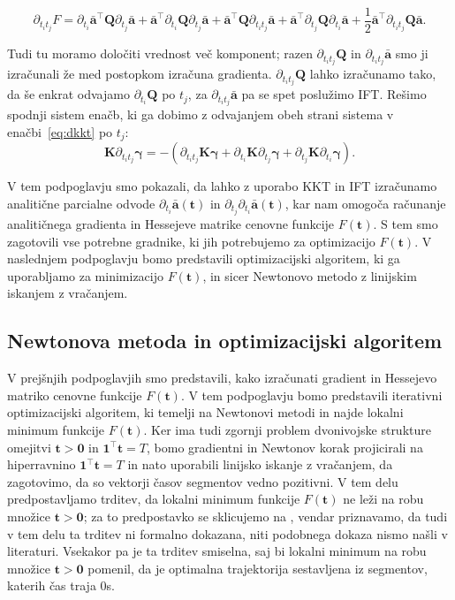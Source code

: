 \documentclass[isrm2, tisk]{fmfdelo}
\newcommand{\aimplicit}{\bar{\mathbf{a}}}
\newcommand{\yimplicit}{\mathbf{\gamma}}
\newcommand{\qmat}{\mathbf{Q}}
\newcommand{\tvec}{\mathbf{t}}
\begin{document}
\begin{equation}
    \label{eq:hess}
    \partial_{t_it_j}F = 
    \partial_{t_i}\aimplicit^\top \qmat \partial_{t_j}\aimplicit 
    + \aimplicit^\top \partial_{t_i}\qmat \partial_{t_j}\aimplicit 
    + \aimplicit^\top \qmat \partial_{t_it_j}\aimplicit 
    + \aimplicit^\top \partial_{t_j}\qmat \partial_{t_i}\aimplicit 
    + \frac{1}{2}\aimplicit^\top \partial_{t_it_j}\qmat \aimplicit.
\end{equation}

Tudi tu moramo določiti vrednost več komponent; razen $\partial_{t_it_j} \qmat$ in $\partial_{t_it_j} \aimplicit$ smo ji izračunali že med postopkom izračuna gradienta. $\partial_{t_it_j} \qmat$ lahko izračunamo tako, da še enkrat odvajamo $\partial_{t_i} \qmat$ po $t_j$, za $\partial_{t_it_j} \aimplicit$ pa se spet poslužimo \ac{IFT}. Rešimo spodnji sistem enačb, ki ga dobimo z odvajanjem obeh strani sistema v enačbi~\eqref{eq:dkkt} po $t_j$:
\begin{equation}
    \label{eq:ddkkt}
    \mathbf{K} \partial_{t_it_j}\yimplicit = - (\partial_{t_it_j} \mathbf{K} \yimplicit
    + \partial_{t_i} \mathbf{K} \partial_{t_j}\yimplicit
    + \partial_{t_j} \mathbf{K} \partial_{t_i}\yimplicit).
\end{equation}

V tem podpoglavju smo pokazali, da lahko z uporabo \ac{KKT} in \ac{IFT} izračunamo analitične parcialne odvode $\partial_{t_i} \aimplicit(\tvec)$ in $\partial_{t_j}\partial_{t_i} \aimplicit(\tvec)$, kar nam omogoča računanje analitičnega gradienta in Hessejeve matrike cenovne funkcije $F(\tvec)$. S tem smo zagotovili vse potrebne gradnike, ki jih potrebujemo za optimizacijo $F(\tvec)$. V naslednjem podpoglavju bomo predstavili optimizacijski algoritem, ki ga uporabljamo za minimizacijo $F(\tvec)$, in sicer Newtonovo metodo z linijskim iskanjem z vračanjem.


\subsection{Newtonova metoda in optimizacijski algoritem}

V prejšnjih podpoglavjih smo predstavili, kako izračunati gradient in Hessejevo matriko cenovne funkcije $F(\tvec)$. V tem podpoglavju bomo predstavili iterativni optimizacijski algoritem, ki temelji na Newtonovi metodi in najde lokalni minimum funkcije $F(\tvec)$. Ker ima tudi zgornji problem dvonivojske strukture omejitvi $\mathbf{t} > \mathbf{0}$ in $\mathbf{1}^\top \mathbf{t} = T$, bomo gradientni in Newtonov korak projicirali na hiperravnino $\mathbf{1}^\top \mathbf{t} = T$ in nato uporabili linijsko iskanje z vračanjem, da zagotovimo, da so vektorji časov segmentov vedno pozitivni. V tem delu predpostavljamo trditev, da lokalni minimum funkcije $F(\tvec)$ ne leži na robu množice $\mathbf{t} > \mathbf{0}$; za to predpostavko se sklicujemo na \cite{sun2021fast}, vendar priznavamo, da tudi v tem delu ta trditev ni formalno dokazana, niti podobnega dokaza nismo našli v literaturi. Vsekakor pa je ta trditev smiselna, saj bi lokalni minimum na robu množice $\mathbf{t} > \mathbf{0}$ pomenil, da je optimalna trajektorija sestavljena iz segmentov, katerih čas traja 0s.
\end{document}
